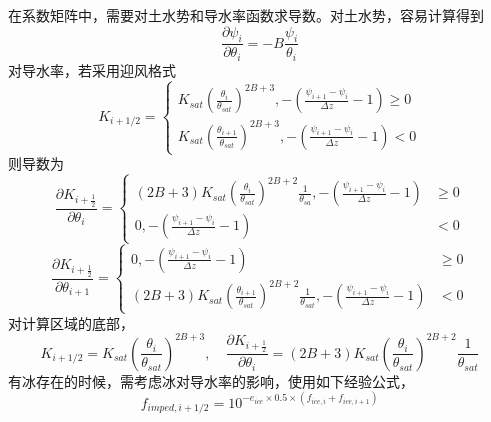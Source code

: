 在系数矩阵中，需要对土水势和导水率函数求导数。对土水势，容易计算得到
\begin{equation}
\frac{\partial \psi_{i}}{\partial \theta_{i}}=-B \frac{\psi_{i}}{\theta_{i}}
\end{equation}
对导水率，若采用迎风格式
\begin{equation}
    K_{i+1/2}=\left\{\begin{array}{l}K_{ {sat }}\left(\frac{\theta_{i}}{\theta_{ {sat }}}\right)^{2 B+3},
        -\left(\frac{\psi_{i+1}-\psi_{i}}{\Delta z}-1\right) \geq 0 \\ K_{ {sat }}\left(\frac{\theta_{i+1}}{\theta_{ {sat }}}\right)^{2 B+3},
        -\left(\frac{\psi_{i+1}-\psi_{i}}{\Delta z}-1\right)<0\end{array}\right.
\end{equation}
则导数为
\begin{equation}
\frac{\partial K_{i+\frac{1}{2}}}{\partial \theta_{i}}=\left\{\begin{aligned}(2 B+3) K_{ {sat }}\left(\frac{\theta_{i}}{\theta_{sat}}\right)^{2 B+2} 
    \frac{1}{\theta_{s a}},-\left(\frac{\psi_{i+1}-\psi_{i}}{\Delta z}-1\right) & \geq 0 \\ 0,-\left(\frac{\psi_{i+1}-\psi_{i}}{\Delta z}-1\right) &<0 \end{aligned}\right.
\end{equation}
\begin{equation}
\frac{\partial K_{i+\frac{1}{2}}}{\partial \theta_{i+1}}=\left\{\begin{aligned} 0,-\left(\frac{\psi_{i+1}-\psi_{i}}{\Delta z}-1\right) &
     \geq 0 \\(2 B+3) K_{ {sat }}\left(\frac{\theta_{i+1}}{\theta_{ {sat }}}\right)^{2 B+2} \frac{1}{\theta_{ {sat }}},-\left(\frac{\psi_{i+1}-\psi_{i}}{\Delta z}-1\right) &<0 \end{aligned}\right.
\end{equation}
对计算区域的底部，
\begin{equation}
K_{i+1 / 2}=K_{ {sat }}\left(\frac{\theta_{i}}{\theta_{ {sat }}}\right)^{2 B+3}, \quad \frac{\partial K_{i+\frac{1}{2}}}
{\partial \theta_{i}}=(2 B+3) K_{ {sat }}\left(\frac{\theta_{i}}{\theta_{ {sat }}}\right)^{2 B+2} \frac{1}{\theta_{sat}}
\end{equation}
有冰存在的时候，需考虑冰对导水率的影响，使用如下经验公式，
\begin{equation}
    {f}_{{imped}, {i}+1 / 2}=10^{-e_{ice}\times 0.5\times\left(f_{i c e, i}+f_{i c e, i+1}\right)}
\end{equation}
